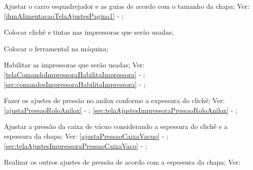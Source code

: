 \begin{procedureAdjustmentNoRecipe}
  \item[\ding{\dingNumber}] Ajustar o carro esquadrejador e as guias de acordo com o tamanho da chapa; Ver: \ref{ihmAlimentacaoTelaAjustesPagina1} - ;
  \item[\ding{\dingNumber}] Colocar clichê e tintas nas impressoras que serão usadas;
  \item[\ding{\dingNumber}] Colocar o ferramental na máquina;
  \item[\ding{\dingNumber}] Habilitar as impressoras que serão usadas; Ver: 
  \ifmachineType
  \ref{telaComandoImpressoraHabilitaImpressora} - ;
  \else
  \ref{sec:comandosImpressoraHabilitaImpressora} - ;
  \fi
  \item[\ding{\dingNumber}] Fazer os ajustes de pressão no anilox conforme a expessura do clichê; Ver: 
  \ifmachineType
  \ref{ajustaPressaoRoloAnilox} - ;
  \else
  \ref{sec:telaAjustesImpressoraPressaoRoloAnilox} - ;
  \fi
  \item[\ding{\dingNumber}] Ajustar a pressão da caixa de vácuo considerando a espessura do clichê e a espessura da chapa; Ver: 
  \ifmachineType
  \ref{ajustaPressaoCaixaVacuo} - ;
  \else
  \ref{sec:telaAjustesImpressoraPressaoCaixaVaco} - ;
  \fi
  \item[\ding{\dingNumber}] Realizar os outros ajustes de pressão de acordo com a espessura da chapa; Ver: 

    \begin{pressureAdjustment}
      \ifmachineType


\end{pressureAdjustment}
\end{procedureAdjustmentNoRecipe}
